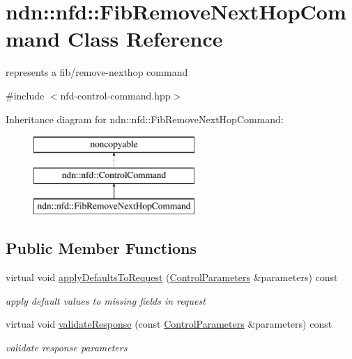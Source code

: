 \hypertarget{classndn_1_1nfd_1_1FibRemoveNextHopCommand}{}\section{ndn\+:\+:nfd\+:\+:Fib\+Remove\+Next\+Hop\+Command Class Reference}
\label{classndn_1_1nfd_1_1FibRemoveNextHopCommand}


represents a fib/remove-\/nexthop command  




{\ttfamily \#include $<$nfd-\/control-\/command.\+hpp$>$}

Inheritance diagram for ndn\+:\+:nfd\+:\+:Fib\+Remove\+Next\+Hop\+Command\+:\begin{figure}[H]
\begin{center}
\leavevmode
\includegraphics[height=3.000000cm]{classndn_1_1nfd_1_1FibRemoveNextHopCommand}
\end{center}
\end{figure}
\subsection*{Public Member Functions}
\begin{DoxyCompactItemize}
\item 
virtual void \hyperlink{classndn_1_1nfd_1_1FibRemoveNextHopCommand_a837053f2453a11b42b5c7b3fcf986d56}{apply\+Defaults\+To\+Request} (\hyperlink{classndn_1_1nfd_1_1ControlParameters}{Control\+Parameters} \&parameters) const\hypertarget{classndn_1_1nfd_1_1FibRemoveNextHopCommand_a837053f2453a11b42b5c7b3fcf986d56}{}\label{classndn_1_1nfd_1_1FibRemoveNextHopCommand_a837053f2453a11b42b5c7b3fcf986d56}

\begin{DoxyCompactList}\small\item\em apply default values to missing fields in request \end{DoxyCompactList}\item 
virtual void \hyperlink{classndn_1_1nfd_1_1FibRemoveNextHopCommand_ab86cd9bd9eb9903c7c76f5f8e636b55a}{validate\+Response} (const \hyperlink{classndn_1_1nfd_1_1ControlParameters}{Control\+Parameters} \&parameters) const
\begin{DoxyCompactList}\small\item\em validate response parameters \end{DoxyCompactList}\end{DoxyCompactItemize}
